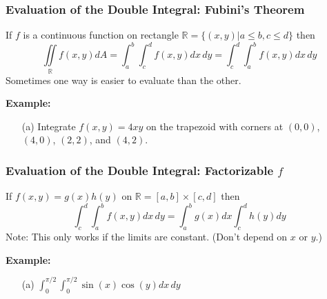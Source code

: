 \documentclass{beamer}
\begin{document}
\begin{frame}
\frametitle{Evaluation of the Double Integral: Fubini's Theorem}
If $f$ is a continuous function on rectangle $\mathbb{R} = \{(x,y)|a\leq b, c\leq d \}$ then
$$\iint\limits_{\mathbb{R}} f(x,y)dA = \int_a^b \int_c^d f(x,y)dx\,dy = \int_c^d \int_a^b  f(x,y)dx\,dy $$
Sometimes one way is easier to evaluate than the other.\\
\vspace{12pt}

\textbf{Example:}

\begin{itemize}
	\item[(a)] Integrate $f(x,y) = 4xy$ on the trapezoid with corners at $(0,0)$, $(4,0)$, $(2,2)$, and $(4,2)$.
\end{itemize}
\end{frame}

\begin{frame}
\frametitle{Evaluation of the Double Integral: Factorizable $f$}
If $f(x,y) = g(x)h(y)$ on $\mathbb{R} = [a,b] \times [c,d]$ then
$$\int_c^d \int_a^b f(x,y) dx\,dy = \int_a^bg(x)dx \int_c^d h(y)dy$$
Note: This only works if the limits are constant. (Don't depend on $x$ or $y$.)
\vspace{12pt}

\textbf{Example:}
\begin{itemize}
	\item[(a)] $\int_0^{\pi/2} \int_0^{\pi/2} \sin(x) \cos(y) dx \,dy$
\end{itemize}
\end{frame}
\end{document}
